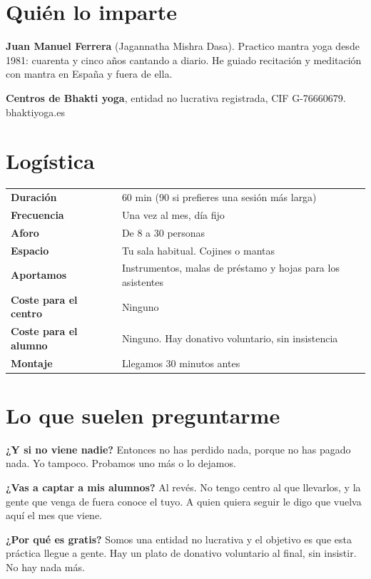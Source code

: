 \documentclass[11pt,a4paper]{article}
\begin{document}
\section{Quién lo imparte}

\textbf{Juan Manuel Ferrera} (Jagannatha Mishra Dasa). Practico mantra yoga
desde 1981: cuarenta y cinco años cantando a diario. He guiado recitación y
meditación con mantra en España y fuera de ella.

\textbf{Centros de Bhakti yoga}, entidad no lucrativa registrada,
CIF G-76660679. bhaktiyoga.es

\section{Logística}

\vspace{0.4em}
{\setlength{\extrarowheight}{3pt}
\begin{tabularx}{\textwidth}{@{}>{\titular\bfseries}l@{\hspace{1.6em}}X@{}}
\toprule
Duración & 60 min (90 si prefieres una sesión más larga) \\
Frecuencia & Una vez al mes, día fijo \\
Aforo & De 8 a 30 personas \\
Espacio & Tu sala habitual. Cojines o mantas \\
Aportamos & Instrumentos, malas de préstamo y hojas para los asistentes \\
Coste para el centro & Ninguno \\
Coste para el alumno & Ninguno. Hay donativo voluntario, sin insistencia \\
Montaje & Llegamos 30 minutos antes \\
\bottomrule
\end{tabularx}}

\section{Lo que suelen preguntarme}

\textbf{¿Y si no viene nadie?} Entonces no has perdido nada, porque no has
pagado nada. Yo tampoco. Probamos uno más o lo dejamos.

\textbf{¿Vas a captar a mis alumnos?} Al revés. No tengo centro al que
llevarlos, y la gente que venga de fuera conoce el tuyo. A quien quiera seguir
le digo que vuelva aquí el mes que viene.

\textbf{¿Por qué es gratis?} Somos una entidad no lucrativa y el objetivo es que
esta práctica llegue a gente. Hay un plato de donativo voluntario al final, sin
insistir. No hay nada más.
\end{document}
